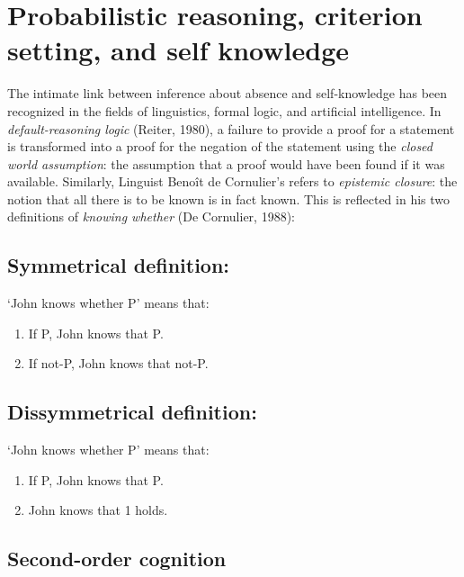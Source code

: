 \documentclass[12pt,twoside]{reedthesis}
\providecommand{\tightlist}{%
  \setlength{\itemsep}{0pt}\setlength{\parskip}{0pt}}
\begin{document}
\hypertarget{formalabsence}{%
\section{Probabilistic reasoning, criterion setting, and self knowledge}\label{formalabsence}}

The intimate link between inference about absence and self-knowledge has been recognized in the fields of linguistics, formal logic, and artificial intelligence. In \emph{default-reasoning logic} (Reiter, 1980), a failure to provide a proof for a statement is transformed into a proof for the negation of the statement using the \emph{closed world assumption}: the assumption that a proof would have been found if it was available. Similarly, Linguist Benoît de Cornulier's refers to \emph{epistemic closure}: the notion that all there is to be known is in fact known. This is reflected in his two definitions of \emph{knowing whether} (De Cornulier, 1988):

\hypertarget{symmetrical-definition}{%
\subsection*{Symmetrical definition:}\label{symmetrical-definition}}

`John knows whether P' means that:
\begin{enumerate}
\def\labelenumi{\arabic{enumi}.}
\tightlist
\item
  If P, John knows that P.
\item
  If not-P, John knows that not-P.
\end{enumerate}
\hypertarget{dissymmetrical-definition}{%
\subsection*{Dissymmetrical definition:}\label{dissymmetrical-definition}}

`John knows whether P' means that:
\begin{enumerate}
\def\labelenumi{\arabic{enumi}.}
\tightlist
\item
  If P, John knows that P.
\item
  John knows that 1 holds.
\end{enumerate}
\hypertarget{second-order-cognition}{%
\subsection{Second-order cognition}\label{second-order-cognition}}
\end{document}
